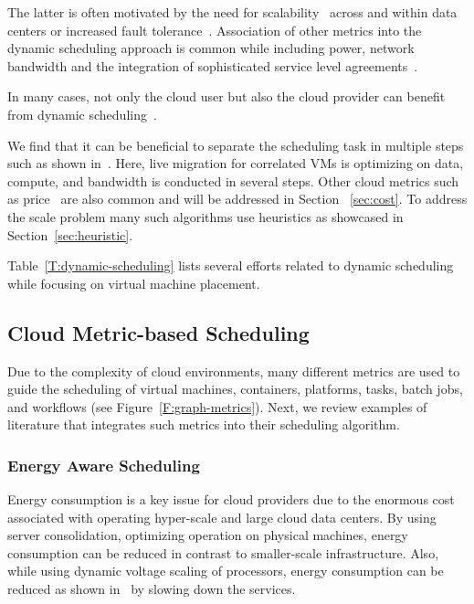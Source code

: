 \documentclass[final,5p,times,twocolumn]{elsarticle}
\begin{document}
The latter is often motivated by the need for scalability~\cite{keller2014hierarchical} across and within data centers or increased fault tolerance~\cite{tighe2013distributed}. Association of other metrics into the dynamic scheduling approach is common while including power, network bandwidth and the integration of sophisticated service level agreements~\cite{tighe2013distributed}.

In many cases, not only the cloud user but also the cloud provider can benefit from dynamic scheduling~\cite{tighe2014integrating}.

We find that it can be beneficial to separate the scheduling task in multiple steps such as shown in~\cite{sun2015live}. Here, live migration for correlated VMs is optimizing on data, compute, and bandwidth is conducted in several steps. Other cloud metrics such as price~\cite{tordsson2012cloud} are also common and will be addressed in Section ~\ref{sec:cost}. To address the scale problem many such algorithms use heuristics as showcased in Section~\ref{sec:heuristic}.

Table~\ref{T:dynamic-scheduling} lists several efforts related to dynamic scheduling while focusing on virtual machine placement.


%



\subsection{Cloud Metric-based Scheduling}\label{sec:vm-scheduling}

Due to the complexity of cloud environments, many different metrics are used to guide the scheduling of virtual machines, containers, platforms, tasks, batch jobs, and workflows (see Figure~\ref{F:graph-metrics}). Next, we review examples of literature that integrates such metrics into their scheduling algorithm.


% 


\subsubsection{Energy Aware Scheduling}\label{sec:energy}

Energy consumption is a key issue for cloud providers due to the enormous cost associated with operating hyper-scale and large cloud data centers. By using server consolidation, optimizing operation on physical machines, energy consumption can be reduced in contrast to smaller-scale infrastructure. Also, while using dynamic voltage scaling of processors, energy consumption can be reduced as shown in~\cite{las09dvfs,las10dvfs,calheiros2014energy} by slowing down the services.
\end{document}
